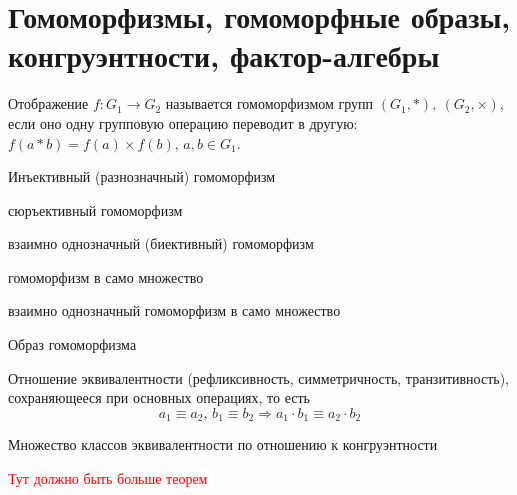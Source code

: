 \documentclass[../main/document.tex]{subfiles}
\begin{document}
\section{Гомоморфизмы, гомоморфные образы,\\ конгруэнтности, фактор-алгебры}
\begin{dfn}[Гомоморфизм]\label{homomorphism}
Отображение $f \colon G_1 \to G_2$ называется гомоморфизмом групп $(G_1,*), ~(G_2,\times)$, если оно одну групповую операцию переводит в другую: $f(a*b)=f(a)\times f(b),\, a,b\in G_1$.
\end{dfn}
\begin{dfn}[Мономорфизм]
Инъективный (разнозначный) гомоморфизм
\end{dfn}
\begin{exm}

\end{exm}
\begin{dfn}[Эпиморфизм]
сюръективный гомоморфизм
\end{dfn}
\begin{exm}

\end{exm}
\begin{dfn}[Изоморфизм]
взаимно однозначный (биективный) гомоморфизм
\end{dfn}
\begin{exm}

\end{exm}
\begin{dfn}[Эндоморфизм]
гомоморфизм в само множество
\end{dfn}
\begin{exm}

\end{exm}
\begin{dfn}[Автоморфизм]
взаимно однозначный гомоморфизм в само множество
\end{dfn}
\begin{exm}

\end{exm}
\begin{dfn}
Образ гомоморфизма
\end{dfn}
\begin{exm}

\end{exm}
\begin{dfn}[Конгруэнтность]
Отношение эквивалентности (рефликсивность, симметричность, транзитивность), сохраняющееся при основных операциях, то есть 
$$a_1\equiv a_2,\, b_1\equiv b_2\Rightarrow a_1\cdot b_1\equiv a_2\cdot b_2$$
\end{dfn}
\begin{dfn}
Множество классов эквивалентности по отношению к конгруэнтности
\end{dfn}
\textcolor{red}{Тут должно быть больше теорем}
\end{document}

